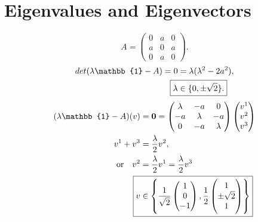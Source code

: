 \documentclass[
a4paper,
10pt,
twoside,
]{article}
\begin{document}
\section{Eigenvalues and Eigenvectors}
\begin{equation}
	A = \begin{pmatrix}
		0 & a & 0\\
		a & 0 & a\\
		0 & a & 0
	\end{pmatrix}.
\end{equation}
\begin{align}
	det(\lambda\mathbb{1}-A) = 0 &= \lambda(\lambda^2-2a^2),\\
	\Aboxed{\lambda &\in \{ 0,\pm\sqrt{2}\}.}
\end{align}
\begin{align}
	(\lambda\mathbb{1}-A)(v) &= \vb{0} =
	\begin{pmatrix}
		\lambda & -a & 0\\
		-a & \lambda & -a\\
		0 & -a & \lambda
	\end{pmatrix}\begin{pmatrix}
		v^1 \\ v^2 \\ v^3
	\end{pmatrix} \\
	v^1 + v^3 &= \frac{\lambda}{2} v^2,\\
	\text{or} \quad v^2 &= \frac{\lambda}{2} v^1 = \frac{\lambda}{2} v^3\\
	\Aboxed{v &\in \left\{
	\frac{1}{\sqrt{2}}\begin{pmatrix}1\\ 0\\ -1\end{pmatrix},
	\frac{1}{2}\begin{pmatrix}1 \\ \pm\sqrt{2} \\ 1\end{pmatrix}
	\right\}}
\end{align}

\printbib


\stopmcols
\end{document}
